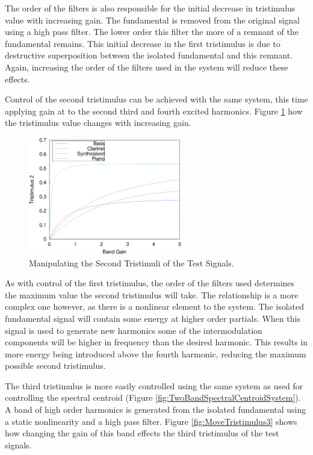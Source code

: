 			The order of the filters is also responsible for the initial decrease in tristimulus value with
			increasing gain. The fundamental is removed from the original signal using a high pass filter. The
			lower order this filter the more of a remnant of the fundamental remains. This initial decrease in
			the first tristimulus is due to destructive superposition between the isolated fundamental and this
			remnant. Again, increasing the order of the filters used in the system will reduce these effects.

			Control of the second tristimulus can be achieved with the same system, this time applying gain at
			to the second third and fourth excited harmonics. Figure \ref{fig:MoveTristimulus2} how the
			tristimulus value changes with increasing gain.

			\begin{figure}[h!]
				\centering
				\includegraphics[width=0.6\textwidth]{chapter6/Images/MoveTristimulus2.eps}
				\caption{Manipulating the Second Tristimuli of the Test Signals.}
				\label{fig:MoveTristimulus2}
			\end{figure}

			As with control of the first tristimulus, the order of the filters used determines the maximum
			value the second tristimulus will take. The relationship is a more complex one however, as there is
			a nonlinear element to the system. The isolated fundamental signal will contain some energy at
			higher order partials.  When this signal is used to generate new harmonics some of the
			intermodulation components will be higher in frequency than the desired harmonic. This results in
			more energy being introduced above the fourth harmonic, reducing the maximum possible second
			tristimulus.

			The third tristimulus is more easily controlled using the same system as used for controlling the
			spectral centroid (Figure \ref{fig:TwoBandSpectralCentroidSystem}). A band of high order harmonics
			is generated from the isolated fundamental using a static nonlinearity and a high pass filter.
			Figure \ref{fig:MoveTristimulus3} shows how changing the gain of this band effects the third
			tristimulus of the test signals.

